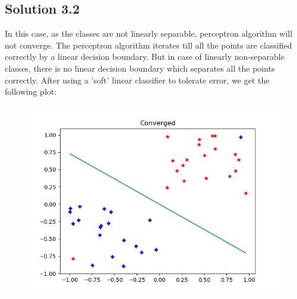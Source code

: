 \subsection*{Solution 3.2}
In this case, as the classes are not linearly separable, perceptron algorithm will not converge. The perceptron algorithm iterates till all the points are classified correctly by a linear decision boundary. But in case of linearly non-separable classes, there is no linear decision boundary which separates all the points correctly. After using a 'soft' linear classifier to tolerate error, we get the following plot:
\begin{figure}[!ht]
	\includegraphics[scale=0.85]{problem3.png}
\end{figure}